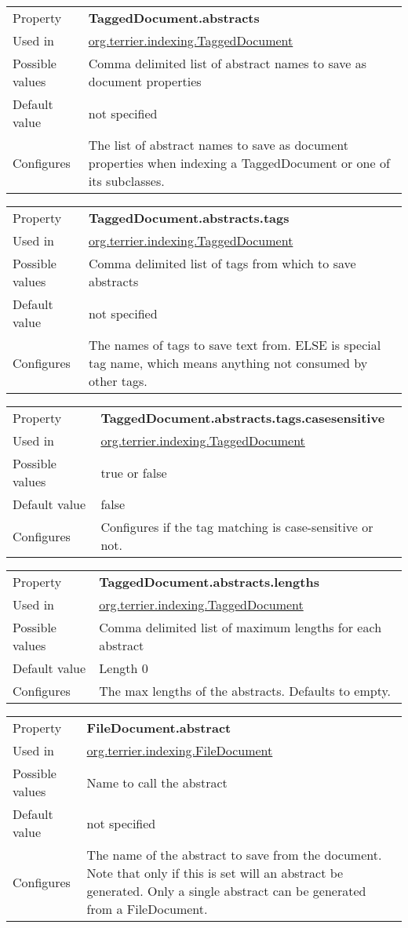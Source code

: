 \begin{longtable}[]{@{}ll@{}}
\toprule
Property & \textbf{TaggedDocument.abstracts}\tabularnewline
Used in &
\href{javadoc/org/terrier/indexing/TaggedDocument.html}{org.terrier.indexing.TaggedDocument}\tabularnewline
Possible values & Comma delimited list of abstract names to save as
document properties\tabularnewline
Default value & not specified\tabularnewline
Configures & The list of abstract names to save as document properties
when indexing a TaggedDocument or one of its subclasses.\tabularnewline
\bottomrule
\end{longtable}

\begin{longtable}[]{@{}ll@{}}
\toprule
Property & \textbf{TaggedDocument.abstracts.tags}\tabularnewline
Used in &
\href{javadoc/org/terrier/indexing/TaggedDocument.html}{org.terrier.indexing.TaggedDocument}\tabularnewline
Possible values & Comma delimited list of tags from which to save
abstracts\tabularnewline
Default value & not specified\tabularnewline
Configures & The names of tags to save text from. ELSE is special tag
name, which means anything not consumed by other tags.\tabularnewline
\bottomrule
\end{longtable}

\begin{longtable}[]{@{}ll@{}}
\toprule
Property &
\textbf{TaggedDocument.abstracts.tags.casesensitive}\tabularnewline
Used in &
\href{javadoc/org/terrier/indexing/TaggedDocument.html}{org.terrier.indexing.TaggedDocument}\tabularnewline
Possible values & true or false\tabularnewline
Default value & false\tabularnewline
Configures & Configures if the tag matching is case-sensitive or
not.\tabularnewline
\bottomrule
\end{longtable}

\begin{longtable}[]{@{}ll@{}}
\toprule
Property & \textbf{TaggedDocument.abstracts.lengths}\tabularnewline
Used in &
\href{javadoc/org/terrier/indexing/TaggedDocument.html}{org.terrier.indexing.TaggedDocument}\tabularnewline
Possible values & Comma delimited list of maximum lengths for each
abstract\tabularnewline
Default value & Length 0\tabularnewline
Configures & The max lengths of the abstracts. Defaults to
empty.\tabularnewline
\bottomrule
\end{longtable}

\begin{longtable}[]{@{}ll@{}}
\toprule
Property & \textbf{FileDocument.abstract}\tabularnewline
Used in &
\href{javadoc/org/terrier/indexing/FileDocument.html}{org.terrier.indexing.FileDocument}\tabularnewline
Possible values & Name to call the abstract\tabularnewline
Default value & not specified\tabularnewline
Configures & The name of the abstract to save from the document. Note
that only if this is set will an abstract be generated. Only a single
abstract can be generated from a FileDocument.\tabularnewline
\bottomrule
\end{longtable}

